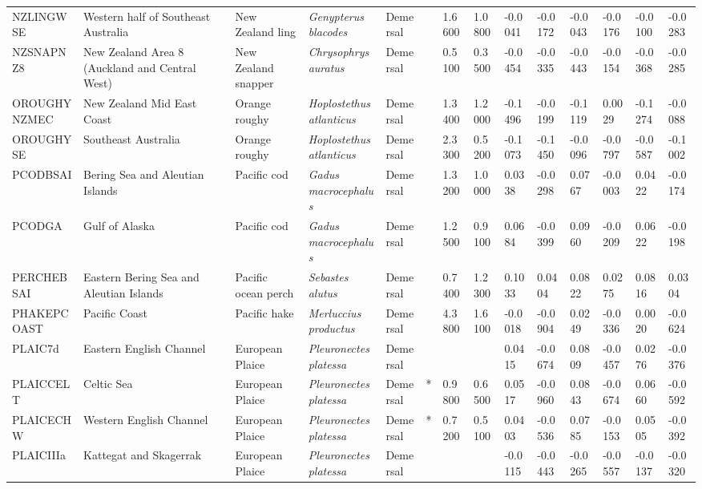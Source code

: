 \begin{longtable}{p{2.6cm}p{1.9cm}p{1.7cm}p{1.6cm}p{1cm}p{0.3cm}p{1cm}p{1cm}p{1cm}p{1.1cm}p{1cm}p{1.1cm}p{1cm}p{1.1cm}}
  NZLINGWSE & Western half of Southeast Australia & New Zealand ling & \textit{Genypterus blacodes} & Demersal &   & 1.6600 & 1.0800 & -0.0041 & -0.0172 & -0.0043 & -0.0176 & -0.0100 & -0.0283 \\ 
  NZSNAPNZ8 & New Zealand Area 8 (Auckland and Central West) & New Zealand snapper & \textit{Chrysophrys auratus} & Demersal &   & 0.5100 & 0.3500 & -0.0454 & -0.0335 & -0.0443 & -0.0154 & -0.0368 & -0.0285 \\ 
  OROUGHYNZMEC & New Zealand Mid East Coast & Orange roughy & \textit{Hoplostethus atlanticus} & Demersal &   & 1.3400 & 1.2000 & -0.1496 & -0.0199 & -0.1119 & 0.0029 & -0.1274 & -0.0088 \\ 
  OROUGHYSE & Southeast Australia & Orange roughy & \textit{Hoplostethus atlanticus} & Demersal &   & 2.3300 & 0.5200 & -0.1073 & -0.1450 & -0.0096 & -0.0797 & -0.0587 & -0.1002 \\ 
  PCODBSAI & Bering Sea and Aleutian Islands & Pacific cod & \textit{Gadus macrocephalus} & Demersal &   & 1.3200 & 1.0000 & 0.0338 & -0.0298 & 0.0767 & -0.0003 & 0.0422 & -0.0174 \\ 
  PCODGA & Gulf of Alaska & Pacific cod & \textit{Gadus macrocephalus} & Demersal &   & 1.2500 & 0.9100 & 0.0684 & -0.0399 & 0.0960 & -0.0209 & 0.0622 & -0.0198 \\ 
  PERCHEBSAI & Eastern Bering Sea and Aleutian Islands & Pacific ocean perch & \textit{Sebastes alutus} & Demersal &   & 0.7400 & 1.2300 & 0.1033 & 0.0404 & 0.0822 & 0.0275 & 0.0816 & 0.0304 \\ 
  PHAKEPCOAST & Pacific Coast & Pacific hake & \textit{Merluccius productus} & Demersal &   & 4.3800 & 1.6100 & -0.0018 & -0.0904 & 0.0249 & -0.0336 & 0.0020 & -0.0624 \\ 
  PLAIC7d & Eastern English Channel & European Plaice & \textit{Pleuronectes platessa} & Demersal &  &  &  & 0.0415 & -0.0674 & 0.0809 & -0.0457 & 0.0276 & -0.0376 \\ 
  PLAICCELT & Celtic Sea & European Plaice & \textit{Pleuronectes platessa} & Demersal & * & 0.9800 & 0.6500 & 0.0517 & -0.0960 & 0.0843 & -0.0674 & 0.0660 & -0.0592 \\ 
  PLAICECHW & Western English Channel & European Plaice & \textit{Pleuronectes platessa} & Demersal & * & 0.7200 & 0.5100 & 0.0403 & -0.0536 & 0.0785 & -0.0153 & 0.0505 & -0.0392 \\ 
  PLAICIIIa & Kattegat and Skagerrak & European Plaice & \textit{Pleuronectes platessa} & Demersal &  &  &  & -0.0115 & -0.0443 & -0.0265 & -0.0557 & -0.0137 & -0.0320 \\ 

\end{longtable}
